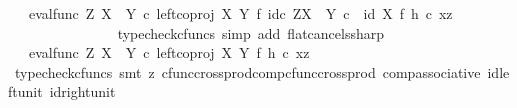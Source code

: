 \begin{isabellebody}
\ {\isachardoublequoteopen}{\isachardot}{\kern0pt}{\isachardot}{\kern0pt}{\isachardot}{\kern0pt}\ {\isacharequal}{\kern0pt}\ {\isacharparenleft}{\kern0pt}{\isacharparenleft}{\kern0pt}eval{\isacharunderscore}{\kern0pt}func\ Z\ {\isacharparenleft}{\kern0pt}X\ {\isasymCoprod}\ Y{\isacharparenright}{\kern0pt}\ {\isasymcirc}\isactrlsub c\ left{\isacharunderscore}{\kern0pt}coproj\ X\ Y\ {\isasymtimes}\isactrlsub f\ id\isactrlsub c\ {\isacharparenleft}{\kern0pt}Z\isactrlbsup {\isacharparenleft}{\kern0pt}X\ {\isasymCoprod}\ Y{\isacharparenright}{\kern0pt}\isactrlesup {\isacharparenright}{\kern0pt}{\isacharparenright}{\kern0pt}\ {\isasymcirc}\isactrlsub c\ \ {\isacharparenleft}{\kern0pt}id\ X\ {\isasymtimes}\isactrlsub f\ h{\isacharparenright}{\kern0pt}{\isacharparenright}{\kern0pt}\ {\isasymcirc}\isactrlsub c\ {\isasymlangle}x{\isacharcomma}{\kern0pt}z{\isasymrangle}{\isachardoublequoteclose}\isanewline
\ \ \ \ \ \ \ \ \ \ \ \ \ \ \isamarkupfalse%
\ {\isacharparenleft}{\kern0pt}typecheck{\isacharunderscore}{\kern0pt}cfuncs{\isacharcomma}{\kern0pt}\ simp\ add{\isacharcolon}{\kern0pt}\ flat{\isacharunderscore}{\kern0pt}cancels{\isacharunderscore}{\kern0pt}sharp{\isacharparenright}{\kern0pt}\isanewline
\ \ \ \ \ \ \ \ \ \ \ \ \isamarkupfalse%
\ \isamarkupfalse%
\ {\isachardoublequoteopen}{\isachardot}{\kern0pt}{\isachardot}{\kern0pt}{\isachardot}{\kern0pt}\ {\isacharequal}{\kern0pt}\ {\isacharparenleft}{\kern0pt}eval{\isacharunderscore}{\kern0pt}func\ Z\ {\isacharparenleft}{\kern0pt}X\ {\isasymCoprod}\ Y{\isacharparenright}{\kern0pt}\ {\isasymcirc}\isactrlsub c\ left{\isacharunderscore}{\kern0pt}coproj\ X\ Y\ {\isasymtimes}\isactrlsub f\ h{\isacharparenright}{\kern0pt}\ {\isasymcirc}\isactrlsub c\ {\isasymlangle}x{\isacharcomma}{\kern0pt}z{\isasymrangle}{\isachardoublequoteclose}\isanewline
\ \ \ \ \ \ \ \ \ \ \ \ \ \ \isamarkupfalse%
\ {\isacharparenleft}{\kern0pt}typecheck{\isacharunderscore}{\kern0pt}cfuncs{\isacharcomma}{\kern0pt}\ smt\ {\isacharparenleft}{\kern0pt}z{}{\isacharparenright}{\kern0pt}\ cfunc{\isacharunderscore}{\kern0pt}cross{\isacharunderscore}{\kern0pt}prod{\isacharunderscore}{\kern0pt}comp{\isacharunderscore}{\kern0pt}cfunc{\isacharunderscore}{\kern0pt}cross{\isacharunderscore}{\kern0pt}prod\ comp{\isacharunderscore}{\kern0pt}associative{}\ id{\isacharunderscore}{\kern0pt}left{\isacharunderscore}{\kern0pt}unit{}\ id{\isacharunderscore}{\kern0pt}right{\isacharunderscore}{\kern0pt}unit{}{\isacharparenright}{\kern0pt}\isanewline
\ \ \ \ \ \ \ \ \ \ \ \ \isamarkupfalse%

\end{isabellebody}
